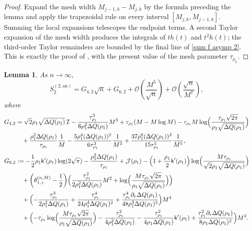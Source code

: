 \documentclass[a4paper]{article}
\newtheorem{lemma}[theorem]{Lemma}
\numberwithin{equation}{section}
\begin{document}
\begin{proof}
Expand the mesh width $M_{j-1,k}-M_{j,k}$ by the formula preceding the lemma and apply the trapezoidal rule on every interval $[M_{j,k},M_{j-1,k}]$. Summing the local expansions telescopes the endpoint terms. A second Taylor expansion of the mesh width produces the integrals of $th(t)$ and $t^2h(t)$; the third-order Taylor remainders are bounded by the final line of \eqref{sum f asymp 2}. This is exactly the proof of \cite[Lemma~2.7]{C2021 FH}, with the present value of the mesh parameter $\tau_{\rho_k}$.
\end{proof}


\begin{lemma}\label{lemma:sum of g1- g1+ part}
As $n\to\infty$,
\begin{equation}
S_2^{(2,\mathrm{an})}
 =
G_{4,2}\sqrt{n}+G_{6,2}+\mathcal{O}(\frac{M^5}{\sqrt{n}})+\mathcal{O}(\frac{\sqrt{n}}{M^7}),
\end{equation}
where 
\begin{align*}
G_{4,2}
&=
\sqrt{2}\rho_1\sqrt{\Delta Q(\rho_1)}\,\mathcal{I}
-
\frac{\tau_{\rho_1}^3}{6\rho_1^2\Delta Q(\rho_1)}M^3
+\tau_{\rho_1}(M-M\log M)
-\tau_{\rho_1}M\log\Bigl(\frac{\tau_{\rho_1}\sqrt{2\pi}}{\rho_1\sqrt{\Delta Q(\rho_1)}}\Bigr)
\\
&\quad
+\frac{\rho_1^2\Delta Q(\rho_1)}{\tau_{\rho_1}}\frac{1}{M}
-\frac{5\rho_1^4(\Delta Q(\rho_1))^2}{6\tau_{\rho_1}^3}\frac{1}{M^3}
+\frac{37\rho_1^6(\Delta Q(\rho_1))^3}{15\tau_{\rho_1}^5}\frac{1}{M^5}, 
\end{align*}
\begin{align*}
G_{6,2}
&:= 
-\frac{1}{2}\rho_1\mathsf{k}'(\rho_1)\log(2\sqrt{\pi})
-\frac{\rho_1^2\Delta Q(\rho_1)}{\tau_{\rho_1}}
+\mathcal{J}(\rho_1)
-
\Bigl( 
1+\frac{\rho_1}{2}\mathsf{k}'(\rho_1)
\Bigr)
\log\Bigl(\frac{M\tau_{\rho_1}}{\sqrt{2}\rho_1\sqrt{\Delta Q(\rho_1)}}\Bigr)
\\
&\quad
+
\bigg(\theta_{1,+}^{(n,M)}-\frac{1}{2} \bigg)
\Bigl( 
\frac{\tau_{\rho_1}^2}{2\rho_1^2\Delta Q(\rho_1)}M^2
+\log\Bigl(\frac{M\tau_{\rho_1}\sqrt{2\pi}}{\rho_1\sqrt{\Delta Q(\rho_1)}}\Bigr)
\Bigr)
\\
&\quad
+
\Bigl( 
-\frac{\tau_{\rho_1}^3}{2\rho_1^2\Delta Q(\rho_1)}
+\frac{\tau_{\rho_1}^4}{24\rho_1^4\Delta Q(\rho_1)^2}
+\frac{\tau_{\rho_1}^4\partial_r\Delta Q(\rho_1)}{48\rho_1^3\Delta Q(\rho_1)^3}
\Bigr)M^4
\\
&\quad
+\Bigl( 
-\tau_{\rho_1}\log\Bigl(\frac{M\tau_{\rho_1}\sqrt{2\pi}}{\rho_1\sqrt{\Delta Q(\rho_1)}}\Bigr)
-\frac{\tau_{\rho_1}^2}{4\rho_1^2\Delta Q(\rho_1)}
-\frac{\tau_{\rho_1}^2}{4\rho_1\Delta Q(\rho_1)}\mathsf{k}'(\rho_1)
+\frac{\tau_{\rho_1}^2\partial_r\Delta Q(\rho_1)}{8\rho_1\Delta Q(\rho_1)^2}
\Bigr)M^2.
\end{align*}
\end{lemma}
\end{document}

